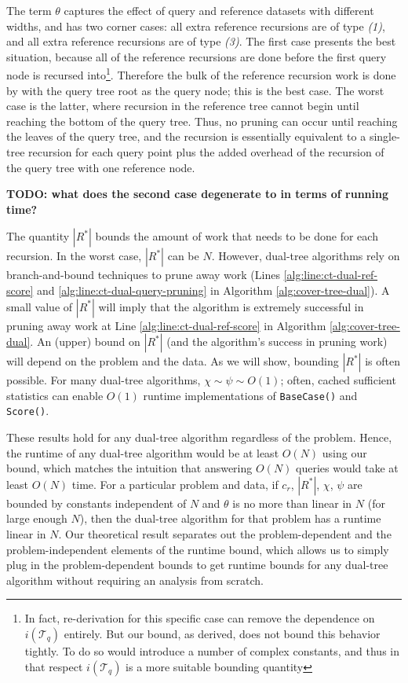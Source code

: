 The term $\theta$ captures the effect of query and reference datasets with
different widths, and has two corner cases: all extra reference recursions are of
type \textit{(1)}, and all extra reference recursions are of type \textit{(3)}.
The first case presents the best situation, because all of the reference
recursions are done before the first query node is recursed into\footnote{In
fact, re-derivation for this specific case can remove the dependence on
$i(\mathscr{T}_q)$ entirely.  But our bound, as derived, does not bound this
behavior tightly.  To do so would introduce a number of complex constants, and
thus in that respect $i(\mathscr{T}_q)$ is a more suitable bounding quantity}.
Therefore the bulk of the reference recursion work is done by with the query
tree root as the query node; this is the best case.  The worst case is the
latter, where recursion in the reference tree cannot begin until reaching the
bottom of the query tree.  Thus, no pruning can occur until reaching the leaves
of the query tree, and the recursion is essentially equivalent to a single-tree
recursion for each query point plus the added overhead of the recursion of the
query tree with one reference node.

{\bf TODO: what does the second case degenerate to in terms of running time?}

The quantity $|R^*|$ bounds the amount of work that needs to be done for each
recursion. In the worst case, $|R^*|$ can be $N$. However,
dual-tree algorithms rely on branch-and-bound techniques to prune away
work (Lines \ref{alg:line:ct-dual-ref-score} and
\ref{alg:line:ct-dual-query-pruning} in Algorithm \ref{alg:cover-tree-dual}). A
small value of $|R^*|$ will imply that the algorithm is extremely successful in
pruning away work at Line \ref{alg:line:ct-dual-ref-score} in Algorithm
\ref{alg:cover-tree-dual}. An (upper) bound on $|R^*|$ (and the algorithm's
success in pruning work) will depend on the problem and the data.  As we will
show, bounding $|R^*|$ is often possible. %
For many dual-tree algorithms, $\chi \sim \psi \sim O(1)$; often, cached
sufficient statistics \citep{moore2000anchors} can enable $O(1)$ runtime
implementations of \texttt{BaseCase()} and \texttt{Score()}.

These results hold for any dual-tree algorithm regardless of the problem. Hence,
the runtime of any dual-tree algorithm
would be at least $O(N)$ using our bound, which matches the intuition that
answering $O(N)$ queries would take at least $O(N)$ time. For a particular
problem and data, if $c_r$, $|R^*|$, $\chi$, $\psi$ are bounded by constants
independent of $N$ and $\theta$ is no more than linear in $N$ (for large enough
$N$), then the dual-tree algorithm for that problem has a runtime linear in $N$.
Our theoretical result separates out the problem-dependent and the
problem-independent elements of the runtime bound, which allows us to simply
plug in the problem-dependent bounds to get runtime bounds for any dual-tree
algorithm without requiring an analysis from scratch.

